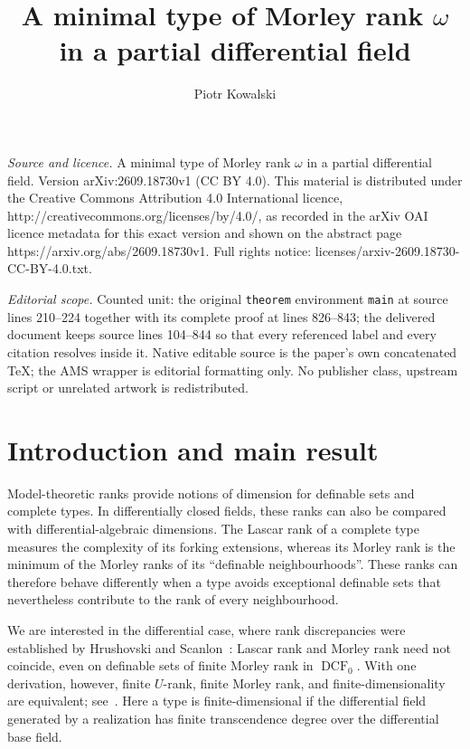 \documentclass[10pt,a4paper]{amsart}
\newcommand{\DCF}{\operatorname{DCF}}
\begin{document}
\title[A minimal type of Morley rank omega in a partial differentia]{A minimal type of Morley rank $\omega$ in a partial differential field}
\author{Piotr Kowalski}
\date{}
\maketitle
\noindent\emph{Source and licence.} A minimal type of Morley rank $\omega$ in a partial differential field. Version arXiv:2609.18730v1 (CC BY 4.0). This material is distributed under the Creative Commons Attribution 4.0 International licence, http://creativecommons.org/licenses/by/4.0/, as recorded in the arXiv OAI licence metadata for this exact version and shown on the abstract page https://arxiv.org/abs/2609.18730v1. Full rights notice: licenses/arxiv-2609.18730-CC-BY-4.0.txt.\par\smallskip
\noindent\textit{Editorial scope.} Counted unit: the original \texttt{theorem} environment \texttt{main} at source lines 210--224 together with its complete proof at lines 826--843; the delivered document keeps source lines 104--844 so that every referenced label and every citation resolves inside it. Native editable source is the paper's own concatenated TeX; the AMS wrapper is editorial formatting only. No publisher class, upstream script or unrelated artwork is redistributed.
\section{Introduction and main result}

Model-theoretic ranks provide notions of dimension for definable sets
and complete types. In differentially closed fields, these ranks can
also be compared with differential-algebraic dimensions. The Lascar
rank of a complete type measures the complexity of its forking
extensions, whereas its Morley rank is the minimum of the Morley
ranks of its ``definable neighbourhoods''. These ranks can therefore
behave differently when a type avoids exceptional definable sets
that nevertheless contribute to the rank of every neighbourhood.

We are interested in the differential case, where rank discrepancies
were established by Hrushovski and Scanlon~\cite{HS}: Lascar rank and
Morley rank need not coincide, even on definable sets of finite
Morley rank in $\DCF_0$. With one derivation, however, finite
$U$-rank, finite Morley rank, and finite-dimensionality are
equivalent; see~\cite{Poizat}. Here a type is finite-dimensional
if the differential field generated by a realization has finite
transcendence degree over the differential base field.
\end{document}
